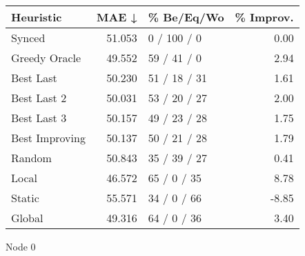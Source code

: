 \begin{tabular}{lrlr}
\toprule
\textbf{Heuristic} & \textbf{MAE ↓} & \textbf{\% Be/Eq/Wo} & \textbf{\% Improv.} \\
\midrule
            Synced &         51.053 &          0 / 100 / 0 &                0.00 \\
     Greedy Oracle &         49.552 &          59 / 41 / 0 &                2.94 \\
         Best Last &         50.230 &         51 / 18 / 31 &                1.61 \\
       Best Last 2 &         50.031 &         53 / 20 / 27 &                2.00 \\
       Best Last 3 &         50.157 &         49 / 23 / 28 &                1.75 \\
    Best Improving &         50.137 &         50 / 21 / 28 &                1.79 \\
            Random &         50.843 &         35 / 39 / 27 &                0.41 \\
             Local &         46.572 &          65 / 0 / 35 &                8.78 \\
            Static &         55.571 &          34 / 0 / 66 &               -8.85 \\
            Global &         49.316 &          64 / 0 / 36 &                3.40 \\
\bottomrule
\end{tabular}
\caption{Node 0}
\label{tab:non_lr05_le1_bs2_0}
